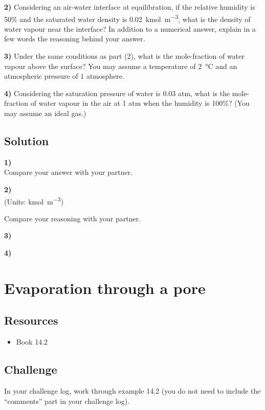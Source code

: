 \textbf{2)} Considering an air-water interface at equilibration, if the relative humidity is 50\% and the saturated water density is \SI{0.02}{\kmol\per\cubic\meter}, what is the density of water vapour near the interface? In addition to a numerical answer, explain in a few words the reasoning behind your answer.

\textbf{3)} Under the same conditions as part (2), what is the mole-fraction of water vapour above the surface? You may assume a temperature of \SI{2}{\celsius} and an atmospheric pressure of $1$ atmosphere.

\textbf{4)} Considering the saturation pressure of water is 0.03 atm, what is the mole-fraction of water vapour in the air at 1 atm when the humidity is 100\%? (You may assume an ideal gas.)

\subsection*{Solution}
\textbf{1)}\\
Compare your answer with your partner.

\textbf{2)}\\
(Units: \si{\kmol\per\cubic\meter})\\

Compare your reasoning with your partner.

\textbf{3)}\\

\textbf{4)}\\




\newpage
\section{Evaporation through a pore}

\subsection*{Resources}
\begin{itemize}
    \item Book 14.2
\end{itemize}

\subsection*{Challenge}
In your challenge log, work through example 14.2 (you do not need to include the ``comments'' part in your challenge log).




